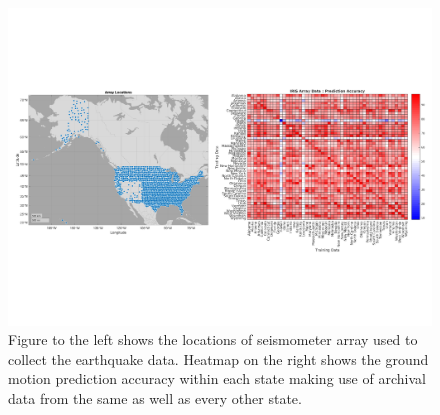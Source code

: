 \documentclass[preprint, aps, showpacs]{revtex4-1}
\newcommand{\rednote}[1]{{\color{red} (#1)}}
\begin{document}

\begin{figure}[!htb]
 \includegraphics[width=\textwidth]{./plots/USArray_with_HeatMap}
 \caption{Figure to the left shows the locations of seismometer array used to collect the earthquake data. Heatmap on the right shows the ground motion prediction accuracy within each state making use of archival data from the same as well as every other state.}
 \label{fig:map}
\end{figure}
\end{document}
